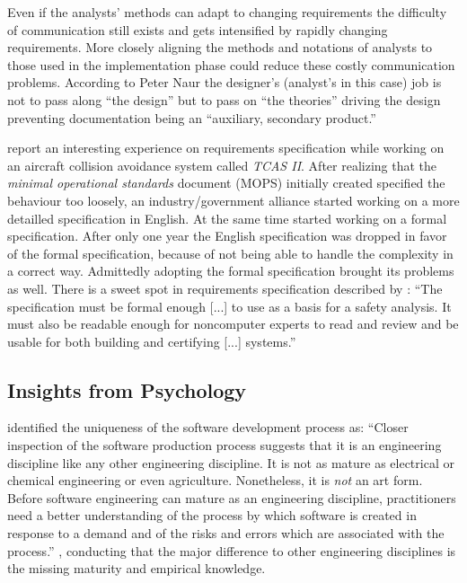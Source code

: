 Even if the analysts' methods can adapt to changing requirements the difficulty of communication still exists and gets intensified by rapidly changing requirements.
More closely aligning the methods and notations of analysts to those used in the implementation phase could reduce these costly communication problems.
According to Peter Naur the designer's (analyst's in this case) job is not to pass along ``the design'' but to pass on ``the theories'' driving the design \autocite{naur_programming_1985} preventing documentation being an ``auxiliary, secondary product.''

\textcite{leveson_experiences_1991} report an interesting experience on requirements specification while working on an aircraft collision avoidance system called \emph{TCAS II}.
After realizing that the \emph{minimal operational standards} document (MOPS) initially created specified the behaviour too loosely, an industry/government alliance started working on a more detailled specification in English.
At the same time \citeauthor{leveson_experiences_1991} started working on a formal specification.
After only one year the English specification was dropped in favor of the formal specification, because of not being able to handle the complexity in a correct way.
Admittedly adopting the formal specification brought its problems as well.
There is a sweet spot in requirements specification described by \textcite{leveson_experiences_1991}: ``The specification must be formal enough [...] to use as a basis for a safety analysis. It must also be readable enough for noncomputer experts to read and review and be usable for both building and certifying [...] systems.''

\subsection{Insights from Psychology}
\label{sub:insights-from-psychology}
\citeauthor{kitchenham_research_1990} identified the uniqueness of the software development process as: ``Closer inspection of the software production process suggests that it is an engineering discipline like any other engineering discipline. It is not as mature as electrical or chemical engineering or even agriculture. Nonetheless, it is \emph{not} an art form. Before software engineering can mature as an engineering discipline, practitioners need a better understanding of the process by which software is created in response to a demand and of the risks and errors which are associated with the process.'' \autocite[274]{kitchenham_research_1990}, conducting that the major difference to other engineering disciplines is the missing maturity and empirical knowledge.

